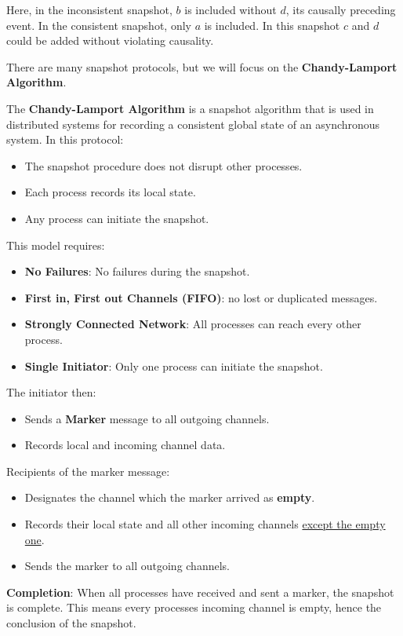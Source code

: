 \noindent 
Here, in the inconsistent snapshot, $b$ is included without $d$, its causally preceding event. In the consistent snapshot, only $a$ is 
included. In this snapshot $c$ and $d$ could be added without violating causality.

\newpage 

\noindent 
There are many snapshot protocols, but we will focus on the \textbf{Chandy-Lamport Algorithm}.
\begin{Def}

    The \textbf{Chandy-Lamport Algorithm} is a snapshot algorithm that is used in distributed systems for
    recording a consistent global state of an asynchronous system. In this protocol:
    \begin{itemize}
        \item The snapshot procedure does not disrupt other processes.
        \item Each process records its local state.
        \item Any process can initiate the snapshot.
    \end{itemize}
    \noindent
    This model requires: 
    \begin{itemize}
        \item \textbf{No Failures}: No failures during the snapshot.
        \item \textbf{First in, First out Channels (FIFO)}: no lost or duplicated messages.
        \item \textbf{Strongly Connected Network}: All processes can reach every other process.
        \item \textbf{Single Initiator}: Only one process can initiate the snapshot.
    \end{itemize}
    
    \noindent 
    The initiator then:
    \begin{itemize}
        \item Sends a \textbf{Marker} message to all outgoing channels.
        \item Records local and incoming channel data.
    \end{itemize}
    Recipients of the marker message:
    \begin{itemize}
        \item Designates the channel which the marker arrived as \textbf{empty}.
        \item Records their local state and all other incoming channels \underline{except the empty one}.
        \item Sends the marker to all outgoing channels.
    \end{itemize}
    \noindent
    \textbf{Completion}: When all processes have received and sent a marker, the snapshot is complete. This 
    means every processes incoming channel is empty, hence the conclusion of the snapshot.
\end{Def}

